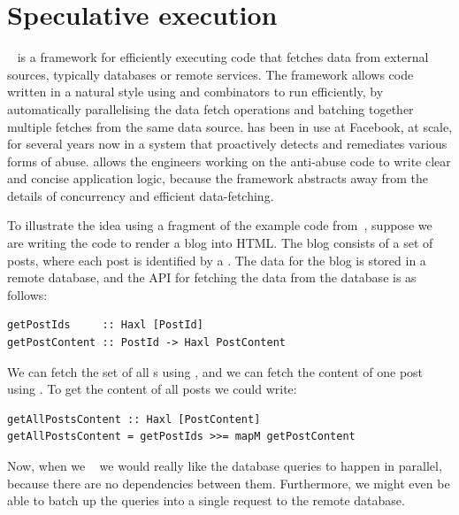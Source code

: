 \section{Speculative execution}\label{sec-haxl}

\Haxl~\citep{marlow2014haxl} is a framework for efficiently executing
code that fetches data from external sources, typically databases or
remote services. The \Haxl framework allows code written in a natural
style using  and  combinators to run
efficiently, by automatically parallelising the data fetch operations
and batching together multiple fetches from the same data source.
\Haxl has been in use at Facebook, at scale, for several years now in
a system that proactively detects and remediates various forms of
abuse. \Haxl allows the engineers working on the anti-abuse code to
write clear and concise application logic, because the framework
abstracts away from the details of concurrency and efficient
data-fetching.

To illustrate the idea using a fragment of the example code
from~\citep{marlow2014haxl}, suppose we are writing the code to render a blog
into HTML. The blog consists of a set of posts, where each post is identified by
a . The data for the blog is stored in a remote database, and the API
for fetching the data from the database is as follows:

\vspace{1mm}
\begin{verbatim}
getPostIds     :: Haxl [PostId]
getPostContent :: PostId -> Haxl PostContent
\end{verbatim}
\vspace{1mm}

\noindent
We can fetch the set of all s using , and we can fetch
the content of one post using . To get the content of all
posts we could write:

\vspace{0.5mm}
\begin{verbatim}
getAllPostsContent :: Haxl [PostContent]
getAllPostsContent = getPostIds >>= mapM getPostContent
\end{verbatim}
\vspace{0.5mm}

\noindent
Now, when we ~ we would really like the
database queries to happen in parallel, because there are no
dependencies between them. Furthermore, we might even be able to batch
up the queries into a single request to the remote database.

